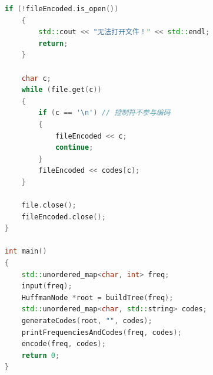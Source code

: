 \documentclass[lang=cn,11pt,a4paper]{elegantpaper}
\begin{document}
\begin{lstlisting}[language=c++]
    if (!fileEncoded.is_open())
    {
        std::cout << "无法打开文件！" << std::endl;
        return;
    }

    char c;
    while (file.get(c))
    {
        if (c == '\n') // 控制符不参与编码
        {
            fileEncoded << c;
            continue;
        }
        fileEncoded << codes[c];
    }

    file.close();
    fileEncoded.close();
}

int main()
{
    std::unordered_map<char, int> freq;
    input(freq);
    HuffmanNode *root = buildTree(freq);
    std::unordered_map<char, std::string> codes;
    generateCodes(root, "", codes);
    printFrequenciesAndCodes(freq, codes);
    encode(freq, codes);
    return 0;
}

\end{lstlisting}
\end{document}
